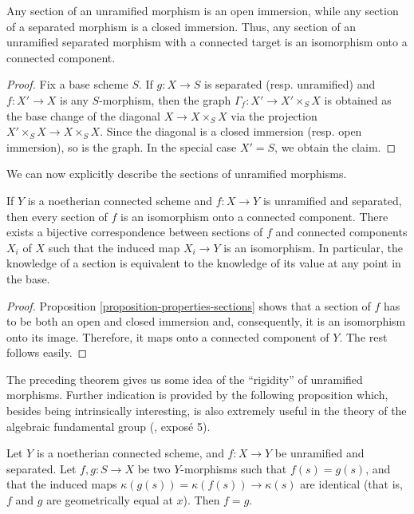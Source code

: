 \begin{proposition}
\label{proposition-properties-sections}
Any section of an unramified morphism is an open immersion, while any section
of a separated morphism is a closed immersion. Thus, any section of an
unramified separated morphism with a connected target is an isomorphism onto a
connected component.
\end{proposition}

\begin{proof}
Fix a base scheme $S$. If $g:X \to S$ is separated (resp. unramified) and
$f:X' \to X$ is any $S$-morphism, then the graph
$\Gamma_f:X' \to X' \times_S X$ is obtained as the base change of the diagonal
$X \to X \times_S X$ via the projection $X' \times_S X \to X \times_S X$.
Since the diagonal is a closed immersion (resp. open immersion), so is the
graph. In the special case $X' = S$, we obtain the claim.
\end{proof}

\noindent
We can now explicitly describe the sections of unramified morphisms. 

\begin{theorem}
\label{theorem-sections-unramified-maps}
If $Y$ is a noetherian connected scheme and $f:X \to Y$ is unramified and
separated, then every section of $f$ is an isomorphism onto a connected
component. There exists a bijective correspondence between sections of $f$ and
connected components $X_i$ of $X$ such that the induced map $X_i \to Y$ is an
isomorphism. In particular, the knowledge of a section is equivalent to the
knowledge of its value at any point in the base.
\end{theorem}

\begin{proof}
Proposition \ref{proposition-properties-sections} shows that a section of $f$
has to be both an open and closed immersion and, consequently, it is an
isomorphism onto its image. Therefore, it maps onto a connected component of
$Y$. The rest follows easily.
\end{proof}

\noindent
The preceding theorem gives us some idea of the ``rigidity'' of unramified
morphisms. Further indication is provided by the following proposition which,
besides being intrinsically interesting, is also extremely useful in the
theory of the algebraic fundamental group (\cite{SGA1}, expos\'e 5).

\begin{proposition}
\label{proposition-equality}
Let $Y$ is a noetherian connected scheme, and $f:X \to Y$ be unramified and
separated. Let $f,g:S \to X$ be two $Y$-morphisms such that $f(s) = g(s)$, and
that the induced maps $\kappa(g(s)) = \kappa(f(s)) \to \kappa(s)$ are
identical (that is, $f$ and $g$ are geometrically equal at $x$). Then $f = g$.
\end{proposition}

